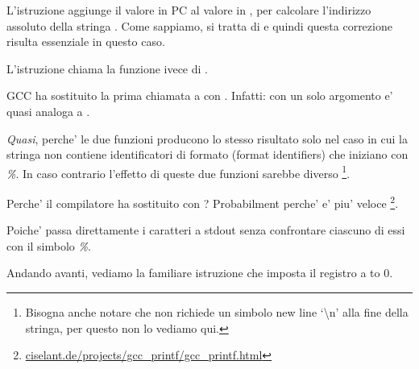 L'istruzione  aggiunge il valore in \ac{PC} al valore in , per calcolare l'indirizzo assoluto della stringa . 
Come sappiamo, si tratta di \q{\PICcode} e quindi questa correzione risulta essenziale in questo caso.

L'istruzione  chiama la funzione \puts ivece di \printf.

\label{puts}

GCC ha sostituito la prima chiamata a \printf con \puts.
Infatti: \printf con un solo argomento e' quasi analoga a \puts. 

\emph{Quasi}, perche' le due funzioni producono lo stesso risultato solo nel caso in cui la stringa non contiene 
identificatori di formato (format identifiers) che iniziano con \emph{\%}. 
In caso contrario l'effetto di queste due funzioni sarebbe diverso
\footnote{Bisogna anche notare che \puts non richiede un simbolo new line `\textbackslash{}n' alla fine della stringa,
per questo non lo vediamo qui.}.

Perche' il compilatore ha sostituito \printf con \puts? Probabilment perche' \puts e' piu' veloce
\footnote{\href{http://go.yurichev.com/17063}{ciselant.de/projects/gcc\_printf/gcc\_printf.html}}. 

Poiche' passa direttamente i caratteri a \gls{stdout} senza confrontare ciascuno di essi con il simbolo \emph{\%}.

Andando avanti, vediamo la familiare istruzione  che imposta il registro  a to 0.
